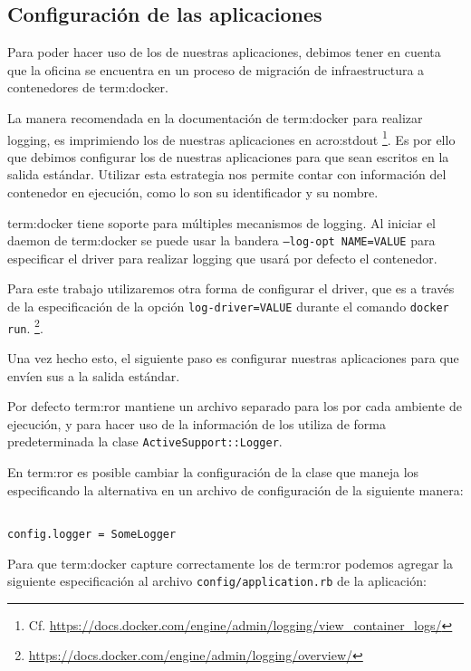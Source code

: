 \subsection{Configuración de las aplicaciones}
\label{configuracion_de_las_aplicaciones}

Para poder hacer uso de los  de nuestras aplicaciones, debimos tener en
cuenta que la oficina se encuentra en un proceso de migración de
infraestructura a contenedores de \gls{term:docker}.

La manera recomendada en la documentación de \gls{term:docker} para realizar
logging, es imprimiendo los  de nuestras aplicaciones en \gls{acro:stdout}
\footnote{Cf. \url{https://docs.docker.com/engine/admin/logging/view_container_logs/}}.
Es por ello que debimos configurar los  de nuestras aplicaciones para que sean
escritos en la salida estándar. Utilizar esta estrategia nos permite contar
con información del contenedor en ejecución, como lo son su identificador y su
nombre.

\gls{term:docker} tiene soporte para múltiples mecanismos de logging. Al
iniciar el daemon de \gls{term:docker} se puede usar la bandera
\texttt{--log-opt NAME=VALUE} para especificar el driver para realizar logging
que usará por defecto el contenedor.

Para este trabajo utilizaremos otra forma de configurar el driver, que es a
través de la especificación de la opción \texttt{log-driver=VALUE} durante el
comando \lstinline{docker run}.
\footnote{\url{https://docs.docker.com/engine/admin/logging/overview/}}.

Una vez hecho esto, el siguiente paso es configurar nuestras aplicaciones para
que envíen sus  a la salida estándar.

Por defecto \gls{term:ror} mantiene un archivo separado para los  por cada
ambiente de ejecución, y para hacer uso de la información de los  utiliza
de forma predeterminada la clase \texttt{ActiveSupport::Logger}.

En \gls{term:ror} es posible cambiar la configuración de la clase que maneja los
 especificando la alternativa en un archivo de configuración de la siguiente manera:

\begin{lstlisting}

config.logger = SomeLogger

\end{lstlisting}

Para que \gls{term:docker} capture correctamente los  de \gls{term:ror}
podemos agregar la siguiente especificación al archivo
\texttt{config/application.rb} de la aplicación:

